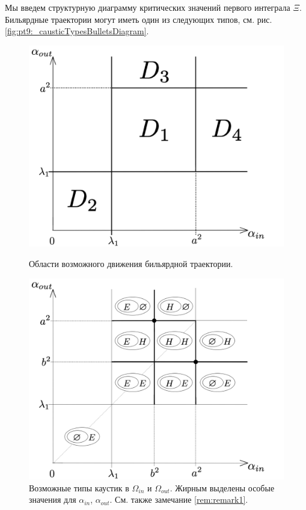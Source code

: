 Мы введем структурную диаграмму критических значений первого интеграла $\Xi$. 
Бильярдные траектории могут иметь один из следующих типов, см. рис. \ref{fig:pt9:_causticTypesBulletsDiagram}.
\begin{figure}[!htb]
\centering
\includegraphics[scale=0.1]{images/section2/causticTypesBulletsDiagram.pdf}
    \caption{Области возможного движения бильярдной траектории.}
    \label{fig:pt9:_causticTypesBulletsDiagram}
\endminipage\hfill
{}
\centering
\includegraphics[scale=0.1]{images/section2/problemAbifurcations.pdf}
    \caption{Возможные типы каустик в $\Omega_{in}$ и $\Omega_{out}$. Жирным выделены особые значения для $\alpha_{in}$, $\alpha_{out}$. См. также замечание \ref{rem:remark1}.}
    \label{fig:pt9:_problemAbifurcations}
\endminipage\hfill
\end{figure}

